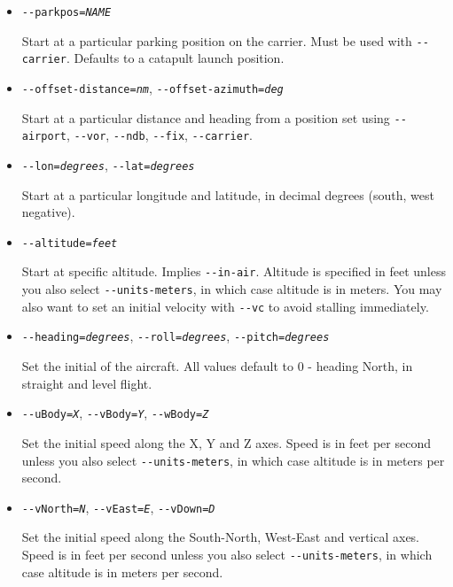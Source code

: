 {\begin{itemize}
  Start on an aircraft carrier. See \ref{carrier} for details of carrier operations.

  \item{\texttt{-$ $-parkpos={\it NAME}}}

  Start at a particular parking position on the carrier. Must be used with \texttt{-$ $-carrier}.
  Defaults to a catapult launch position.

  \item{\texttt{-$ $-offset-distance={\it nm}}, \texttt{-$ $-offset-azimuth={\it deg}}}

  Start at a particular distance and heading from a position set using \texttt{-$ $-airport},
  \texttt{-$ $-vor}, \texttt{-$ $-ndb}, \texttt{-$ $-fix}, \texttt{-$ $-carrier}.

  \item{\texttt{-$ $-lon={\it degrees}}, \texttt{-$ $-lat={\it degrees}}}

  Start at a particular longitude and latitude, in decimal degrees (south, west negative).

  \item{\texttt{-$ $-altitude={\it feet}}}

  Start at specific altitude. Implies \texttt{-$ $-in-air}. Altitude is specified in feet unless you
  also select \texttt{-$ $-units-meters}, in which case altitude is in meters. You may also want to set
  an initial velocity with \texttt{-$ $-vc} to avoid stalling immediately.

  \item{\texttt{-$ $-heading={\it degrees}}, \texttt{-$ $-roll={\it degrees}}, \texttt{-$ $-pitch={\it degrees}}}

  Set the initial  of the aircraft. All values default to 0 - heading North, in straight and level flight.

  \item{\texttt{-$ $-uBody={\it X}}, \texttt{-$ $-vBody={\it Y}}, \texttt{-$ $-wBody={\it Z}}}

  Set the initial speed along the X, Y and Z axes. Speed is in feet per second unless you
  also select \texttt{-$ $-units-meters}, in which case altitude is in meters per second.

  \item{\texttt{-$ $-vNorth={\it N}}, \texttt{-$ $-vEast={\it E}}, \texttt{-$ $-vDown={\it D}}}

  Set the initial speed along the South-North, West-East and vertical axes. Speed is in feet per second unless you
  also select \texttt{-$ $-units-meters}, in which case altitude is in meters per second.


\end{itemize}}
